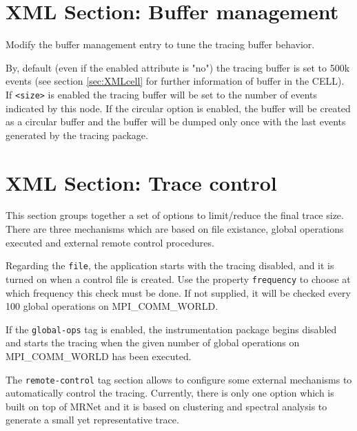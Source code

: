 
\section{XML Section: Buffer management}\label{sec:XMLSectionBuffer}

Modify the buffer management entry to tune the tracing buffer behavior.



By, default (even if the enabled attribute is "no") the tracing buffer is set to 500k events (see section \ref{sec:XMLcell} for further information of buffer in the CELL). If {\tt <size>} is enabled the tracing buffer will be set to the number of events indicated by this node. If the circular option is enabled, the buffer will be created as a circular buffer and the buffer will be dumped only once with the last events generated by the tracing package.


\section{XML Section: Trace control}\label{sec:XMLSectionTraceControl}



This section groups together a set of options to limit/reduce the final trace size. There are three mechanisms which are based on file existance, global operations executed and external remote control procedures.

Regarding the {\tt file}, the application starts with the tracing disabled, and it is turned on when a control file is created. Use the property {\tt frequency} to choose at which frequency this check must be done. If not supplied, it will be checked every 100 global operations on MPI\_COMM\_WORLD.

If the {\tt global-ops} tag is enabled, the instrumentation package begins disabled and starts the tracing when the given number of global operations on MPI\_COMM\_WORLD has been executed.

The {\tt remote-control} tag section allows to configure some external mechanisms to automatically control the tracing. Currently, there is only one option which is built on top of MRNet and it is based on clustering and spectral analysis to generate a small yet representative trace.

